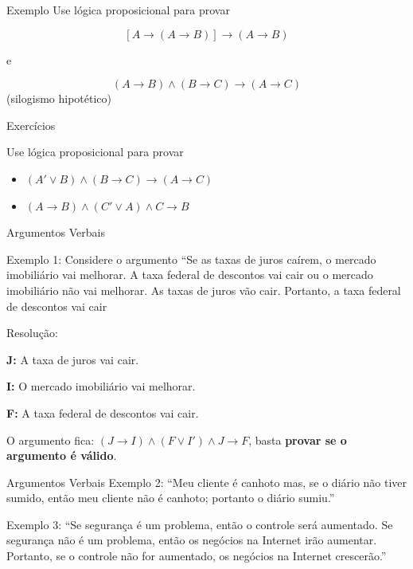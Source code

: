 \documentclass[aspectratio=169]{beamer}
\begin{document}
\begin{frame}{Exemplo}
    Use lógica proposicional para provar

    \[ [A \rightarrow (A \rightarrow B)] \rightarrow (A \rightarrow B)  \]

    e

    \[ (A \rightarrow B) \wedge (B \rightarrow C) \rightarrow (A \rightarrow C) \] (silogismo hipotético)

\end{frame}


\begin{frame}{Exercícios}

    Use lógica proposicional para provar

    \begin{itemize}
        \item $(A' \vee B) \wedge (B \rightarrow C) \rightarrow (A \rightarrow C) $
        \item $ (A \rightarrow B) \wedge (C' \vee A) \wedge C \rightarrow B $
    \end{itemize}
\end{frame}

\begin{frame}{Argumentos Verbais}

    Exemplo 1: Considere o argumento “Se as taxas de juros caírem, o mercado imobiliário
    vai melhorar. A taxa federal de descontos vai cair ou o mercado imobiliário não vai
    melhorar. As taxas de juros vão cair. Portanto, a taxa federal de descontos vai cair
    \vspace{4mm}

    Resolução:

    \textbf{J:} A taxa de juros vai cair.

    \textbf{I:} O mercado imobiliário vai melhorar.

    \textbf{F:} A taxa federal de descontos vai cair.

    O argumento fica: $(J \rightarrow I) \wedge (F \vee I') \wedge J \rightarrow F$, basta \textbf{provar se o argumento é válido}.

\end{frame}

\begin{frame}{Argumentos Verbais}
    Exemplo 2: ``Meu cliente é canhoto mas, se o diário não tiver sumido, então meu
    cliente não é canhoto; portanto o diário sumiu.''
    \vspace{4mm}

    Exemplo 3: ``Se segurança é um problema, então o controle será aumentado.
    Se segurança não é um problema, então os negócios na Internet irão aumentar.
    Portanto, se o controle não for aumentado, os negócios na Internet crescerão.''

\end{frame}
\end{document}
